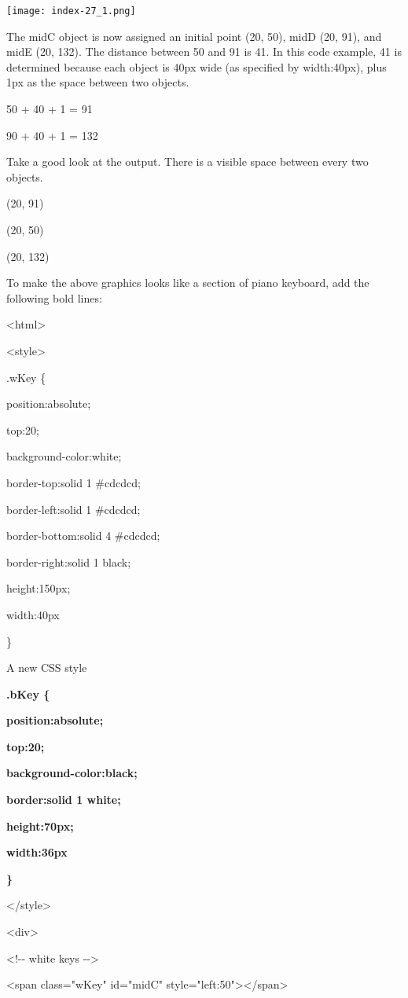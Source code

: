 \documentclass[
]{article}
\begin{document}
\protect\hypertarget{index_split_003.htmlux5cux23p27}{}{}\texttt{[image: index-27\_1.png]}

The midC object is now assigned an initial point (20, 50), midD (20,
91), and midE (20, 132). The distance between 50 and 91 is 41. In this
code example, 41 is determined because each object is 40px wide (as
specified by width:40px), plus 1px as the space between two objects.

50 + 40 + 1 = 91

90 + 40 + 1 = 132

Take a good look at the output. There is a visible space between every
two objects.

(20, 91)

(20, 50)

(20, 132)

To make the above graphics looks like a section of piano keyboard, add
the following bold lines:

\textless html\textgreater{}

\textless style\textgreater{}

.wKey \{

position:absolute;

top:20;

background-color:white;

border-top:solid 1 \#cdcdcd;

border-left:solid 1 \#cdcdcd;

border-bottom:solid 4 \#cdcdcd;

border-right:solid 1 black;

height:150px;

width:40px

\}

A new CSS style

\textbf{.bKey \{}

\textbf{position:absolute;}

\textbf{top:20;}

\textbf{background-color:black;}

\textbf{border:solid 1 white;}

\textbf{height:70px;}

\textbf{width:36px}

\textbf{\}}

\textless/style\textgreater{}

\textless div\textgreater{}

\textless!-\/- white keys -\/-\textgreater{}

\textless span class="wKey" id="midC"
style="left:50"\textgreater\textless/span\textgreater{}
\end{document}
